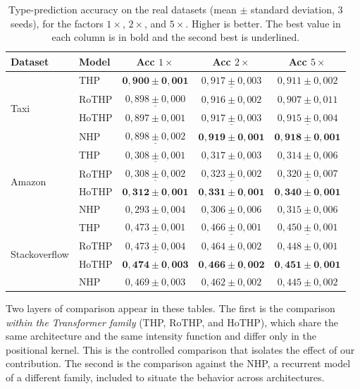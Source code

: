 \begin{table}[h!]
\centering
\caption{Type-prediction accuracy on the real datasets (mean $\pm$ standard deviation, 3 seeds), for the factors $1\times$, $2\times$, and $5\times$. Higher is better. The best value in each column is in bold and the second best is underlined.}
\label{tab:acc-reais}
\begin{tabular}{llccc}
\toprule
Dataset & Model & Acc $1\times$ & Acc $2\times$ & Acc $5\times$ \\
\midrule
\multirow{4}{*}{Taxi}
    & THP    & $\mathbf{0{,}900 \pm 0{,}001}$ & $\underline{0{,}917 \pm 0{,}003}$ & $0{,}911 \pm 0{,}002$ \\
    & RoTHP  & $\underline{0{,}898 \pm 0{,}000}$ & $0{,}916 \pm 0{,}002$ & $0{,}907 \pm 0{,}011$ \\
    & HoTHP  & $0{,}897 \pm 0{,}001$ & $\underline{0{,}917 \pm 0{,}003}$ & $\underline{0{,}915 \pm 0{,}004}$ \\
    & NHP    & $\underline{0{,}898 \pm 0{,}002}$ & $\mathbf{0{,}919 \pm 0{,}001}$ & $\mathbf{0{,}918 \pm 0{,}001}$ \\
\midrule
\multirow{4}{*}{Amazon}
    & THP    & $\underline{0{,}308 \pm 0{,}001}$ & $0{,}317 \pm 0{,}003$ & $0{,}314 \pm 0{,}006$ \\
    & RoTHP  & $\underline{0{,}308 \pm 0{,}002}$ & $\underline{0{,}323 \pm 0{,}002}$ & $\underline{0{,}320 \pm 0{,}007}$ \\
    & HoTHP  & $\mathbf{0{,}312 \pm 0{,}001}$ & $\mathbf{0{,}331 \pm 0{,}001}$ & $\mathbf{0{,}340 \pm 0{,}001}$ \\
    & NHP    & $0{,}293 \pm 0{,}004$ & $0{,}306 \pm 0{,}006$ & $0{,}315 \pm 0{,}006$ \\
\midrule
\multirow{4}{*}{Stackoverflow}
    & THP    & $\underline{0{,}473 \pm 0{,}001}$ & $\underline{0{,}466 \pm 0{,}001}$ & $\underline{0{,}450 \pm 0{,}001}$ \\
    & RoTHP  & $\underline{0{,}473 \pm 0{,}004}$ & $0{,}464 \pm 0{,}002$ & $0{,}448 \pm 0{,}001$ \\
    & HoTHP  & $\mathbf{0{,}474 \pm 0{,}003}$ & $\mathbf{0{,}466 \pm 0{,}002}$ & $\mathbf{0{,}451 \pm 0{,}001}$ \\
    & NHP    & $0{,}469 \pm 0{,}003$ & $0{,}462 \pm 0{,}002$ & $0{,}445 \pm 0{,}002$ \\
\bottomrule
\end{tabular}
\end{table}

Two layers of comparison appear in these tables. The first is the comparison \textit{within the Transformer family} (THP, RoTHP, and HoTHP), which share the same architecture and the same intensity function and differ only in the positional kernel. This is the controlled comparison that isolates the effect of our contribution. The second is the comparison against the NHP, a recurrent model of a different family, included to situate the behavior across architectures.

